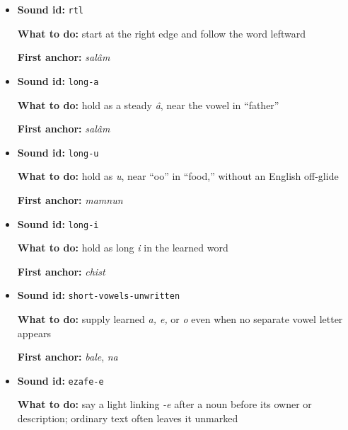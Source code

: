 \begin{itemize}
\raggedright
\setlength{\itemsep}{0.35em}
  \item \begin{minipage}[t]{\linewidth}
  \textbf{Sound id:} \texttt{rtl}
  \par \textbf{What to do:} start at the right edge and follow the word leftward
  \par \textbf{First anchor:} \textbf{} \emph{salâm}
  \end{minipage}
  \item \begin{minipage}[t]{\linewidth}
  \textbf{Sound id:} \texttt{long-a}
  \par \textbf{What to do:} hold \textbf{} as a steady \emph{â}, near the vowel in “father”
  \par \textbf{First anchor:} \textbf{} \emph{salâm}
  \end{minipage}
  \item \begin{minipage}[t]{\linewidth}
  \textbf{Sound id:} \texttt{long-u}
  \par \textbf{What to do:} hold \textbf{} as \emph{u}, near “oo” in “food,” without an English off-glide
  \par \textbf{First anchor:} \textbf{} \emph{mamnun}
  \end{minipage}
  \item \begin{minipage}[t]{\linewidth}
  \textbf{Sound id:} \texttt{long-i}
  \par \textbf{What to do:} hold \textbf{} as long \emph{i} in the learned word
  \par \textbf{First anchor:} \textbf{} \emph{chist}
  \end{minipage}
  \item \begin{minipage}[t]{\linewidth}
  \textbf{Sound id:} \texttt{short-vowels-unwritten}
  \par \textbf{What to do:} supply learned \emph{a, e,} or \emph{o} even when no separate vowel letter appears
  \par \textbf{First anchor:} \textbf{} \emph{bale}, \textbf{} \emph{na}
  \end{minipage}
  \item \begin{minipage}[t]{\linewidth}
  \textbf{Sound id:} \texttt{ezafe-e}
  \par \textbf{What to do:} say a light linking \emph{-e} after a noun before its owner or description; ordinary text often leaves it unmarked

\end{minipage}
\end{itemize}
